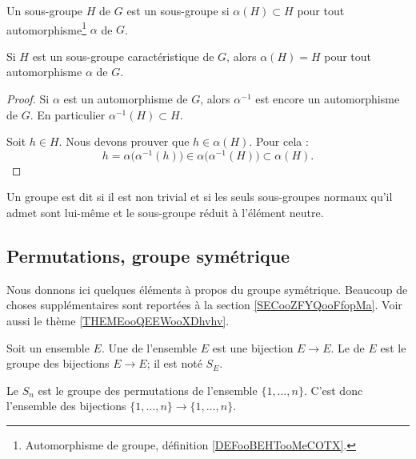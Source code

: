 \begin{definition}      \label{DEFooUXXTooCCLmQe}
	Un sous-groupe \( H\) de \( G\) est un sous-groupe  si \( \alpha(H)\subset H\) pour tout automorphisme\footnote{Automorphisme de groupe, définition \ref{DEFooBEHTooMeCOTX}.} \( \alpha\) de \( G\).
\end{definition}

\begin{lemma}
	Si \( H\) est un sous-groupe caractéristique de \( G\), alors \( \alpha(H)=H\) pour tout automorphisme \( \alpha\) de \( G\).
\end{lemma}

\begin{proof}
	Si \( \alpha\) est un automorphisme de \( G\), alors \( \alpha^{-1}\) est encore un automorphisme de \( G\). En particulier \( \alpha^{-1}(H)\subset H\).

	Soit \( h\in H\). Nous devons prouver que \( h\in \alpha(H)\). Pour cela :
	\begin{equation}
		h=\alpha\big( \alpha^{-1}(h) \big)\in \alpha\big( \alpha^{-1}(H) \big)\subset\alpha(H).
	\end{equation}
\end{proof}

\begin{definition}                 \label{DefGroupeSimple}
	Un groupe est dit  si il est non trivial et si les seuls sous-groupes normaux qu'il admet sont lui-même et le sous-groupe réduit à l'élément neutre.
\end{definition}


\subsection{Permutations, groupe symétrique}

Nous donnons ici quelques éléments à propos du groupe symétrique. Beaucoup de choses supplémentaires sont reportées à la section \ref{SECooZFYQooFfopMa}. Voir aussi le thème \ref{THEMEooQEEWooXDhvhv}.


\begin{definition}      \label{DEFooJNPIooMuzIXd}
	Soit un ensemble \( E\). Une  de l'ensemble \( E\) est une bijection \( E\to E\). Le  de \( E\) est le groupe des bijections \( E\to E\); il est noté \( S_E\).

	Le  \( S_n\) est le groupe des permutations de l'ensemble \( \{ 1,\ldots,n \}\). C'est donc l'ensemble des bijections \( \{ 1,\ldots, n \}\to\{ 1,\ldots, n \}\).
\end{definition}

